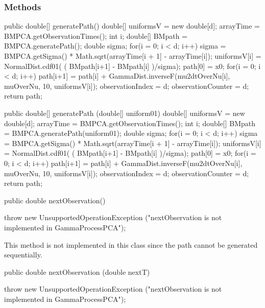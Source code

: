 \subsubsection* {Methods}
\begin{code}\begin{hide}

   public double[] generatePath() {
        double[] uniformsV = new double[d];
        arrayTime = BMPCA.getObservationTimes();
        int i;
        double[] BMpath = BMPCA.generatePath();
        double sigma;
        for(i = 0; i < d; i++){
            sigma = BMPCA.getSigma() * Math.sqrt(arrayTime[i + 1] - arrayTime[i]);
            uniformsV[i] = NormalDist.cdf01( ( BMpath[i+1] - BMpath[i] )/sigma);
        }
        path[0] = x0;
        for(i = 0; i < d; i++){
            path[i+1] = path[i] +
               GammaDist.inverseF(mu2dtOverNu[i], muOverNu, 10, uniformsV[i]);
        }
        observationIndex   = d;
        observationCounter = d;
        return path;
    }


   public double[] generatePath (double[] uniform01)  {
        double[] uniformsV = new double[d];
        arrayTime = BMPCA.getObservationTimes();
        int i;
        double[] BMpath = BMPCA.generatePath(uniform01);
        double sigma;
        for(i = 0; i < d; i++){
            sigma = BMPCA.getSigma() * Math.sqrt(arrayTime[i + 1] - arrayTime[i]);
            uniformsV[i] = NormalDist.cdf01( ( BMpath[i+1] - BMpath[i] )/sigma);
        }
        path[0] = x0;
        for(i = 0; i < d; i++){
            path[i+1] = path[i] +
               GammaDist.inverseF(mu2dtOverNu[i], muOverNu, 10, uniformsV[i]);
        }
        observationIndex   = d;
        observationCounter = d;
        return path;
    }\end{hide}

   public double nextObservation()\begin{hide} {
       throw new UnsupportedOperationException ("nextObservation is not implemented in GammaProcessPCA");
    }\end{hide}
\end{code}
\begin{tabb} This method is not implemented in this class since the path
cannot be generated sequentially.
\end{tabb}
\begin{code}

   public double nextObservation (double nextT) \begin{hide} {
       throw new UnsupportedOperationException ("nextObservation is not implemented in GammaProcessPCA");
    }\end{hide}
\end{code}
